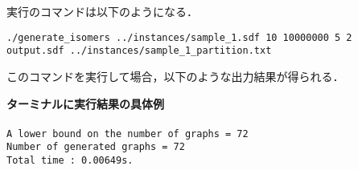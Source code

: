 \documentclass[11pt,titlepage,dvipdfmx,twoside]{jarticle}
\begin{document}
実行のコマンドは以下のようになる．

\bigskip


{\tt ./generate\_isomers ../instances/sample\_1.sdf 10 10000000 5 2} \\
 {\tt output.sdf ../instances/sample\_1\_partition.txt}	


\bigskip

このコマンドを実行して場合，以下のような出力結果が得られる．

\begin{oframed}
{\bf ターミナルに実行結果の具体例}\\\\
{\tt A lower bound on the number of graphs = 72\\
Number of generated graphs = 72\\
Total time : 0.00649s.}
\end{oframed}
\end{document}
